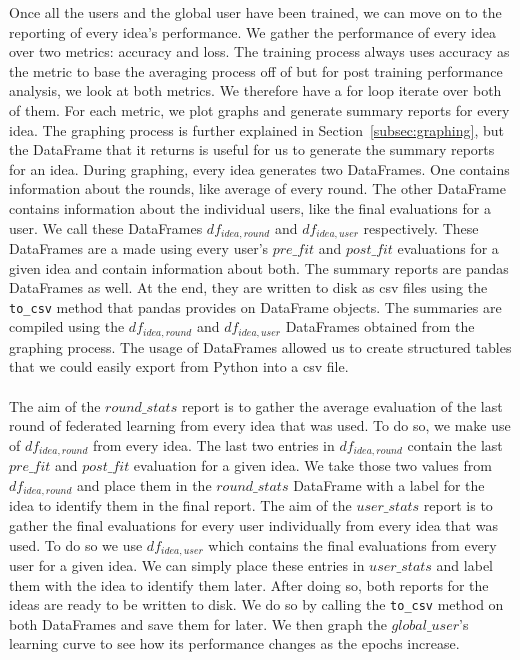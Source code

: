 \documentclass[12pt]{article}
\begin{document}
Once all the users and the global user have been trained, we can move on to the reporting of every idea's performance. We gather the performance of every idea over two metrics: accuracy and loss. The training process always uses accuracy as the metric to base the averaging process off of but for post training performance analysis, we look at both metrics. We therefore have a for loop iterate over both of them. For each metric, we plot graphs and generate summary reports for every idea. The graphing process is further explained in Section~\ref{subsec:graphing}, but the DataFrame that it returns is useful for us to generate the summary reports for an idea. During graphing, every idea generates two DataFrames. One contains information about the rounds, like average of every round. The other DataFrame contains information about the individual users, like the final evaluations for a user. We call these DataFrames $df_{idea, round}$ and $df_{idea, user}$ respectively. These DataFrames are a made using every user's $pre\_fit$ and $post\_fit$ evaluations for a given idea and contain information about both. The summary reports are pandas DataFrames as well. At the end, they are written to disk as csv files using the \texttt{to\_csv} method that pandas provides on DataFrame objects. The summaries are compiled using the $df_{idea, round}$ and $df_{idea, user}$ DataFrames obtained from the graphing process. The usage of DataFrames allowed us to create structured tables that we could easily export from Python into a csv file. 
\\\\
The aim of the $round\_stats$ report is to gather the average evaluation of the last round of federated learning from every idea that was used. To do so, we make use of $df_{idea, round}$ from every idea. The last two entries in $df_{idea, round}$ contain the last $pre\_fit$ and $post\_fit$ evaluation for a given idea. We take those two values from $df_{idea, round}$ and place them in the $round\_stats$ DataFrame with a label for the idea to identify them in the final report. The aim of the $user\_stats$ report is to gather the final evaluations for every user individually from every idea that was used. To do so we use $df_{idea, user}$ which contains the final evaluations from every user for a given idea. We can simply place these entries in $user\_stats$ and label them with the idea to identify them later. After doing so, both reports for the ideas are ready to be written to disk. We do so by calling the \texttt{to\_csv} method on both DataFrames and save them for later. We then graph the $global\_user$'s learning curve to see how its performance changes as the epochs increase. 
\end{document}
